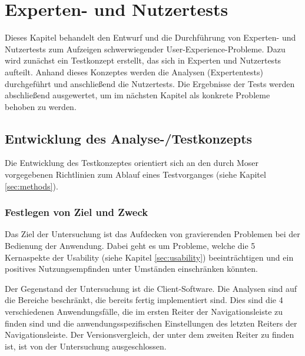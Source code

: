 \chapter{Experten- und Nutzertests} \label{sec:analysisTests}
Dieses Kapitel behandelt den Entwurf und die Durchführung von Experten- und Nutzertests zum Aufzeigen schwerwiegender User-Experience-Probleme. Dazu wird zunächst ein Testkonzept erstellt, das sich in Experten und Nutzertests aufteilt. Anhand dieses Konzeptes werden die Analysen (Expertentests) durchgeführt und anschließend die Nutzertests. Die Ergebnisse der Tests werden abschließend ausgewertet, um im nächsten Kapitel als konkrete Probleme behoben zu werden.\par
\section{Entwicklung des Analyse-/Testkonzepts} \label{sec:analysisConcept}
Die Entwicklung des Testkonzeptes orientiert sich an den durch Moser vorgegebenen Richtlinien zum Ablauf eines Testvorganges (siehe Kapitel \ref{sec:methods}).\par
\subsection{Festlegen von Ziel und Zweck}
Das Ziel der Untersuchung ist das Aufdecken von gravierenden Problemen bei der Bedienung der Anwendung. Dabei geht es um Probleme, welche die 5 Kernaspekte der Usability (siehe Kapitel \ref{sec:usability}) beeinträchtigen und ein positives Nutzungsempfinden unter Umständen einschränken könnten.\par
Der Gegenstand der Untersuchung ist die Client-Software. Die Analysen sind auf die Bereiche beschränkt, die bereits fertig implementiert sind. Dies sind die 4 verschiedenen Anwendungsfälle, die im ersten Reiter der Navigationsleiste zu finden sind und die anwendungsspezifischen Einstellungen des letzten Reiters der Navigationsleiste. Der Versionsvergleich, der unter dem zweiten Reiter zu finden ist, ist von der Untersuchung ausgeschlossen.\par%
